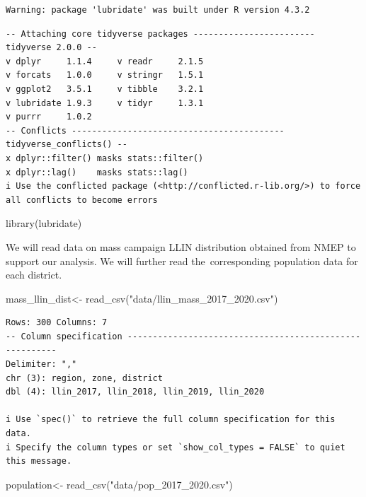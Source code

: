 \documentclass[
  letterpaper,
  DIV=11,
  numbers=noendperiod]{scrreprt}
\newenvironment{Shaded}{\begin{snugshade}}{\end{snugshade}}
\newcommand{\FunctionTok}[1]{\textcolor[rgb]{0.28,0.35,0.67}{#1}}
\newcommand{\NormalTok}[1]{\textcolor[rgb]{0.00,0.23,0.31}{#1}}
\newcommand{\OtherTok}[1]{\textcolor[rgb]{0.00,0.23,0.31}{#1}}
\newcommand{\StringTok}[1]{\textcolor[rgb]{0.13,0.47,0.30}{#1}}
\begin{document}
\begin{verbatim}
Warning: package 'lubridate' was built under R version 4.3.2
\end{verbatim}

\begin{verbatim}
-- Attaching core tidyverse packages ------------------------ tidyverse 2.0.0 --
v dplyr     1.1.4     v readr     2.1.5
v forcats   1.0.0     v stringr   1.5.1
v ggplot2   3.5.1     v tibble    3.2.1
v lubridate 1.9.3     v tidyr     1.3.1
v purrr     1.0.2     
-- Conflicts ------------------------------------------ tidyverse_conflicts() --
x dplyr::filter() masks stats::filter()
x dplyr::lag()    masks stats::lag()
i Use the conflicted package (<http://conflicted.r-lib.org/>) to force all conflicts to become errors
\end{verbatim}

\begin{Shaded}
\begin{Highlighting}[]
\FunctionTok{library}\NormalTok{(lubridate)}
\end{Highlighting}
\end{Shaded}

We will read data on mass campaign LLIN distribution obtained from NMEP
to support our analysis. We will further read the~corresponding
population data for each district.

\begin{Shaded}
\begin{Highlighting}[]
\NormalTok{mass\_llin\_dist}\OtherTok{\textless{}{-}} \FunctionTok{read\_csv}\NormalTok{(}\StringTok{"data/llin\_mass\_2017\_2020.csv"}\NormalTok{) }
\end{Highlighting}
\end{Shaded}

\begin{verbatim}
Rows: 300 Columns: 7
-- Column specification --------------------------------------------------------
Delimiter: ","
chr (3): region, zone, district
dbl (4): llin_2017, llin_2018, llin_2019, llin_2020

i Use `spec()` to retrieve the full column specification for this data.
i Specify the column types or set `show_col_types = FALSE` to quiet this message.
\end{verbatim}

\begin{Shaded}
\begin{Highlighting}[]
\NormalTok{population}\OtherTok{\textless{}{-}} \FunctionTok{read\_csv}\NormalTok{(}\StringTok{"data/pop\_2017\_2020.csv"}\NormalTok{)}
\end{Highlighting}
\end{Shaded}
\end{document}
